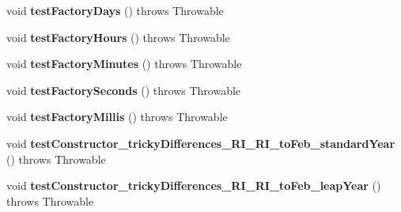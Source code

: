 \begin{DoxyCompactItemize}
\item 
\hypertarget{classorg_1_1joda_1_1time_1_1_test_period___constructors_ad6c09c3ab5150c39c4b513dd161d76db}{void {\bfseries test\-Factory\-Days} ()  throws Throwable }\label{classorg_1_1joda_1_1time_1_1_test_period___constructors_ad6c09c3ab5150c39c4b513dd161d76db}

\item 
\hypertarget{classorg_1_1joda_1_1time_1_1_test_period___constructors_a3f8587b724dfe221b86bce418a8e7fb9}{void {\bfseries test\-Factory\-Hours} ()  throws Throwable }\label{classorg_1_1joda_1_1time_1_1_test_period___constructors_a3f8587b724dfe221b86bce418a8e7fb9}

\item 
\hypertarget{classorg_1_1joda_1_1time_1_1_test_period___constructors_a0d74c8d15fe1592f804140059bc39866}{void {\bfseries test\-Factory\-Minutes} ()  throws Throwable }\label{classorg_1_1joda_1_1time_1_1_test_period___constructors_a0d74c8d15fe1592f804140059bc39866}

\item 
\hypertarget{classorg_1_1joda_1_1time_1_1_test_period___constructors_a6d7c85910ddaeb2c7d165c821dd6829f}{void {\bfseries test\-Factory\-Seconds} ()  throws Throwable }\label{classorg_1_1joda_1_1time_1_1_test_period___constructors_a6d7c85910ddaeb2c7d165c821dd6829f}

\item 
\hypertarget{classorg_1_1joda_1_1time_1_1_test_period___constructors_a1346231044b5ed559e985f583cbfacac}{void {\bfseries test\-Factory\-Millis} ()  throws Throwable }\label{classorg_1_1joda_1_1time_1_1_test_period___constructors_a1346231044b5ed559e985f583cbfacac}

\item 
\hypertarget{classorg_1_1joda_1_1time_1_1_test_period___constructors_a35e4c373f27a8d6a0a42e35eb5e1c0e7}{void {\bfseries test\-Constructor\-\_\-tricky\-Differences\-\_\-\-R\-I\-\_\-\-R\-I\-\_\-to\-Feb\-\_\-standard\-Year} ()  throws Throwable }\label{classorg_1_1joda_1_1time_1_1_test_period___constructors_a35e4c373f27a8d6a0a42e35eb5e1c0e7}

\item 
\hypertarget{classorg_1_1joda_1_1time_1_1_test_period___constructors_acf46036916030b1ed686029a3883987a}{void {\bfseries test\-Constructor\-\_\-tricky\-Differences\-\_\-\-R\-I\-\_\-\-R\-I\-\_\-to\-Feb\-\_\-leap\-Year} ()  throws Throwable }\label{classorg_1_1joda_1_1time_1_1_test_period___constructors_acf46036916030b1ed686029a3883987a}


\end{DoxyCompactItemize}
